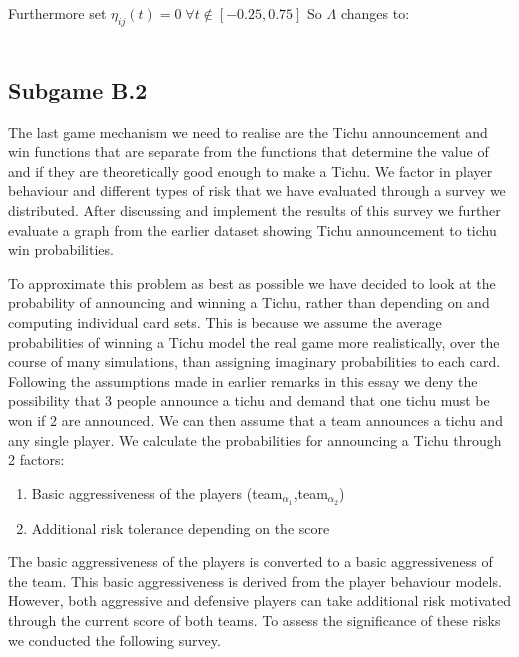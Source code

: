 Furthermore set $\eta_{ij}(t)=0\;\forall t\not\in [-0.25, 0.75]$
So $\Lambda$ changes to:
\\ \\
\noindent{}

\subsection{Subgame B.2}
The last game mechanism we need to realise are the Tichu announcement and win functions that are separate from the functions that determine the value of and if they are theoretically good enough to make a Tichu. We factor in player behaviour and different types of risk that we have evaluated through a survey we distributed. After discussing and  implement the results of  this survey we further evaluate a graph from the earlier dataset showing Tichu announcement to tichu win probabilities. 

To approximate this problem as best as possible we have decided to look at the probability of announcing and winning a Tichu, rather than depending on and computing individual card sets. This is because we assume the average probabilities of winning a Tichu model the real game more realistically, over the course of many simulations, than assigning imaginary probabilities to each card. Following the assumptions made in earlier remarks in this essay we deny the possibility that 3 people announce a tichu and demand that one tichu must be won if 2 are announced. We can then assume that a team announces a tichu and any single player. We calculate the probabilities for announcing a Tichu through 2 factors:
\begin{enumerate}
\item Basic aggressiveness of the players (team$_{\alpha_1}$,team$_{\alpha_2}$)
\item  Additional risk tolerance depending on the score
\end{enumerate}
The basic aggressiveness of the players is converted to a basic aggressiveness of the team. This basic aggressiveness is derived from the player behaviour models. However, both aggressive and defensive players can take additional risk motivated through the current score of both teams. To assess the significance of these risks we conducted the following survey.

